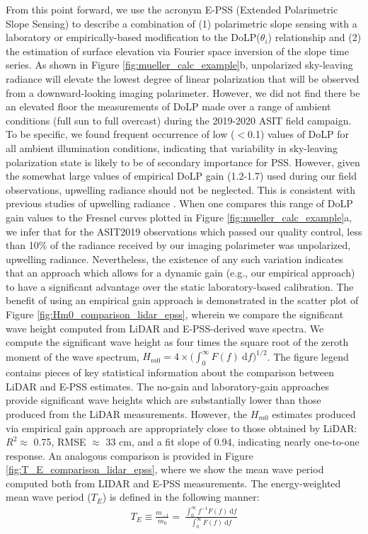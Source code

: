\documentclass[letterpaper,journal]{IEEEtran}
\begin{document}
	From this point forward, we use the acronym E-PSS (Extended Polarimetric Slope Sensing) to describe a combination of (1) polarimetric slope sensing with a laboratory or empirically-based modification to the DoLP($\theta_i$) relationship and (2) the estimation of surface elevation via Fourier space inversion of the slope time series. As shown in Figure \ref{fig:mueller_calc_example}b, unpolarized sky-leaving radiance will elevate the lowest degree of linear polarization that will be observed from a downward-looking imaging polarimeter. However, we did not find there be an elevated floor the measurements of DoLP made over a range of ambient conditions (full sun to full overcast) during the 2019-2020 ASIT field campaign. To be specific, we found frequent occurrence of low ($<$0.1) values of DoLP for all ambient illumination conditions, indicating that variability in sky-leaving polarization state is likely to be of secondary importance for PSS. However, given the somewhat large values of empirical DoLP gain (1.2-1.7) used during our field observations, upwelling radiance should not be neglected. This is consistent with previous studies of upwelling radiance \cite{You2011,ibrahim_relationship_2012}. When one compares this range of DoLP gain values to the Fresnel curves plotted in Figure \ref{fig:mueller_calc_example}a, we infer that for the ASIT2019 observations which passed our quality control, less than 10\% of the radiance received by our imaging polarimeter was unpolarized, upwelling radiance. Nevertheless, the existence of any such variation indicates that an approach which allows for a dynamic gain (e.g., our empirical approach) to have a significant advantage over the static laboratory-based calibration. The benefit of using an empirical gain approach is demonstrated in the scatter plot of Figure \ref{fig:Hm0_comparison_lidar_epss}, wherein we compare the significant wave height computed from LiDAR and E-PSS-derived wave spectra. We compute the significant wave height as four times the square root of the zeroth moment of the wave spectrum, $H_{m0}=4\times\Big(\int_0^\infty F(f)~\mathrm{d}f\Big)^{1/2}$. The figure legend contains pieces of key statistical information about the comparison between LiDAR and E-PSS estimates. The no-gain and laboratory-gain approaches provide significant wave heights which are substantially lower than those produced from the LiDAR measurements. However, the $H_{m0}$ estimates produced via empirical gain approach are appropriately close to those obtained by LiDAR: $R^2\approx$ 0.75, RMSE $\approx$ 33 cm, and a fit slope of 0.94, indicating nearly one-to-one response.
	An analogous comparison is provided in Figure \ref{fig:T_E_comparison_lidar_epss}, where we show the mean wave period computed both from LIDAR and E-PSS measurements. The energy-weighted mean wave period ($T_{E}$) is defined in the following manner:
	\begin{align}
		T_{E}\equiv\frac{m_{-1}}{m_0}=~ \frac{\int_0^\infty f^{-1}F(f)~\mathrm{d}f}{\int_0^\infty F(f)~\mathrm{d}f}
	\end{align}
	
\end{document}

